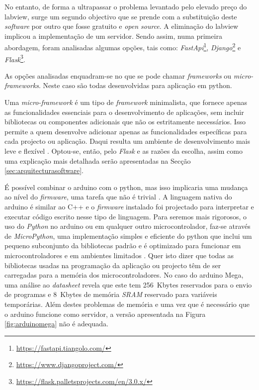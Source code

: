 No entanto, de forma a ultrapassar o problema levantado pelo elevado preço do \acrshort{labview}, surge um segundo objectivo que se prende com a substituição deste \textit{software} por outro que fosse gratuito e \textit{open source}. A eliminação do \acrshort{labview} implicou a implementação de um servidor. Sendo assim, numa primeira abordagem, foram analisadas algumas opções, tais como: \textit{FastApi}\footnote{\url{https://fastapi.tiangolo.com/}}, \textit{Django}\footnote{\url{https://www.djangoproject.com/}} e \textit{Flask}\footnote{\url{https://flask.palletsprojects.com/en/3.0.x/}}.

As opções analisadas enquadram-se no que se pode chamar \textit{frameworks} ou \textit{micro-frameworks}. Neste caso são todas desenvolvidas para aplicação em \gls{python}.

Uma \textit{micro-framework} é um tipo de \textit{framework} minimalista, que fornece apenas as funcionalidades essenciais para o desenvolvimento de aplicações, sem incluir bibliotecas ou componentes adicionais que não os estritamente necessários. Isso permite a quem desenvolve adicionar apenas as funcionalidades específicas para cada projecto ou aplicação. Daqui resulta um ambiente de desenvolvimento mais leve e flexível \cite{Flask}.
Optou-se, então, pelo \textit{Flask} e as razões da escolha, assim como uma explicação mais detalhada serão apresentadas na Secção \ref{sec:arquitecturasoftware}.

É possível combinar o \gls{arduino} com o \gls{python}, mas isso implicaria uma mudança ao nível do \textit{firmware}, uma tarefa que não é trivial \cite{Arduinopython}. A linguagem nativa do \gls{arduino} é similar ao C++ e o \textit{firmware} instalado foi projectado para interpretar e executar código escrito nesse tipo de linguagem. Para seremos mais rigorosos, o uso do \textit{Python} no \gls{arduino} ou em qualquer outro microcontrolador, faz-se através de \textit{MicroPython}, uma implementação simples e eficiente do \gls{python} que inclui um pequeno subconjunto da bibliotecas padrão e é optimizado para funcionar em microcontroladores e em ambientes limitados \cite{MicroPythondefinition}. Quer isto dizer que todas as bibliotecas usadas na programação da aplicação ou projecto têm de ser carregadas para a memória dos microcontroladores. No caso do \gls{arduino} Mega, uma análise ao \textit{datasheet} \cite{megadatasheet} revela que este tem \SI{256}{Kbytes} reservados para o envio de programas e \SI{8}{Kbytes} de memória \textit{SRAM} reservado para variáveis temporárias.
Além destes problemas de memória e uma vez que é necessário que o \gls{arduino} funcione como servidor, a versão apresentada na Figura \ref{fig:arduinomega} não é adequada.

